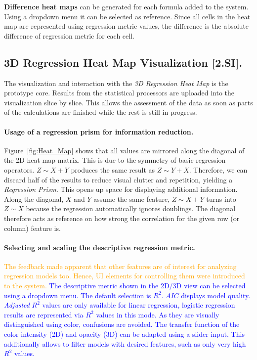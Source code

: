 \documentclass[journal]{style/vgtc} 			          %
\newcommand{\add}[1]{\textcolor{blue}{#1}}
\newcommand{\design}[1]{\textcolor{orange}{#1}}
\begin{document}
\textbf{Difference heat maps} can be generated for each formula added to the system. %
Using a dropdown menu it can be selected as reference.
Since all cells in the heat map are represented using regression metric values, the difference is the absolute difference of regression metric for each cell.
\subsection{3D Regression Heat Map Visualization [2.SI].}
The visualization and interaction with the \emph{3D Regression Heat Map} is the prototype core.
Results from the statistical processors are uploaded into the visualization slice by slice.
This allows the assessment of the data as soon as parts of the calculations are finished while the rest is still in progress.

\paragraph{Usage of a regression prism for information reduction.}
Figure~\ref{fig:Heat_Map} shows that all values are mirrored along the diagonal of the 2D heat map matrix.
This is due to the symmetry of basic regression operators.
$Z \sim X + Y$ produces the same result as $Z \sim Y + X$.
Therefore, we can discard half of the results to reduce visual clutter and repetition, yielding a \emph{Regression Prism}.
This opens up space for displaying additional information.
Along the diagonal, $X$ and $Y$ assume the same feature, $Z \sim X + Y$ turns into $Z \sim X$ because the regression automatically ignores doublings.
The diagonal therefore acts as reference on how strong the correlation for the given row (or column) feature is.

\paragraph{Selecting and scaling the descriptive regression metric.}
\design{
The feedback made apparent that other features are of interest for analyzing regression models too.
Hence, UI elements for controlling them were introduced to the system.
}
\add{
The descriptive metric shown in the 2D/3D view can be selected using a dropdown menu.
The default selection is $R^2$.
$AIC$ displays model quality.
\emph{Adjusted} $R^2$ values are only available for linear regression, logistic regression results are represented via $R^2$ values in this mode.
As they are visually distinguished using color, confusions are avoided.
The transfer function of the color intensity (2D) and opacity (3D) can be adapted using a slider input.
This additionally allows to filter models with desired features, such as only very high $R^2$ values.
}
\end{document}
